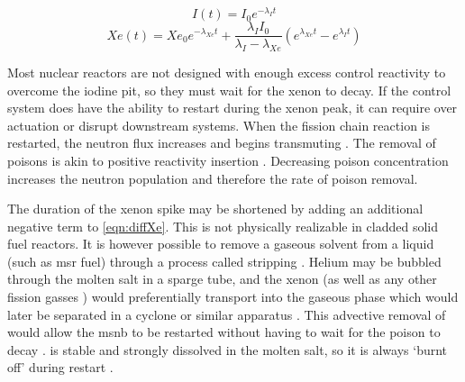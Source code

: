 \begin{equation}\label{eqn:I_inf}
    I(t) = I_0e^{-\lambda_I t}
\end{equation}
\begin{equation}\label{eqn:Xe_inf}
    Xe(t) = Xe_0e^{-\lambda_{Xe} t}+\frac{\lambda_I I_0}{\lambda_I - \lambda_{Xe}}(e^{\lambda_{Xe}t}-e^{\lambda_{I}t})
\end{equation}

Most nuclear reactors are not designed with enough excess control reactivity to overcome the iodine pit, so they must wait for the xenon to decay. If the control system does have the ability to restart during the xenon peak, it can require over actuation or disrupt downstream systems. When the fission chain reaction is restarted, the neutron flux increases and begins transmuting \Xe. The removal of poisons is akin to positive reactivity insertion \cite{Roberson}. Decreasing poison concentration increases the neutron population and therefore the rate of poison removal.  

The duration of the xenon spike may be shortened by adding an additional negative term to \ref{eqn:diffXe}. This is not physically realizable in cladded solid fuel reactors. It is however possible to remove a gaseous solvent from a liquid (such as \acs{msr} fuel) through a process called stripping \cite[Ch. 10]{Geankoplis}. Helium may be bubbled through the molten salt in a sparge tube, and the xenon (as well as any other fission gasses \cite{Offgas}) would preferentially transport into the gaseous phase which would later be separated in a cyclone or similar apparatus \cite{ORNL-masstransport}. This advective removal of \Xe would allow the \acs{msnb} to be restarted without having to wait for the poison to decay \cite{RootXe}. \Sm is stable and strongly dissolved in the molten salt, so it is always `burnt off' during restart \cite[Ch. 7]{Lamarsh}.